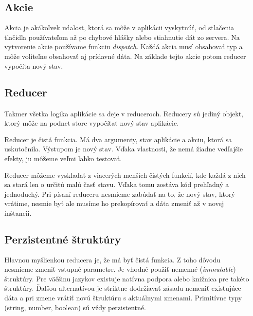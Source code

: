\subsection{Akcie}
Akcia je akákoľvek udalosť, ktorá sa môže v aplikácii vyskytnúť, od stlačenia tlačidla používateľom až po chybové hlášky alebo stiahnutie dát zo servera. Na vytvorenie akcie používame funkciu \emph{dispatch}. Každá akcia musí obsahovať typ a môže voliteľne obsahovať aj prídavné dáta. Na základe tejto akcie potom reducer vypočíta nový stav.

\subsection{Reducer}
\emph{} \cite{reduxReducer}

\paragraph{}
Takmer všetka logika aplikácie sa deje v reduceroch. Reducery sú jediný objekt, ktorý môže na podnet store vypočítať nový stav aplikácie.

Reducer je čistá funkcia. Má dva argumenty, stav aplikácie a akciu, ktorá sa uskutočnila. Výstupom je nový stav. Vďaka vlastnosti, že nemá žiadne vedľajšie efekty, ju môžeme veľmi ľahko testovať.

Reducer môžeme vyskladať z viacerých menších čistých funkcií, kde každá z nich sa stará len o určitú malú časť stavu. Vďaka tomu zostáva kód prehľadný a jednoduchý. 
Pri písaní reduceru nesmieme zabúdať na to, že nový stav, ktorý vrátime, nesmie byť  ale musíme ho prekopírovať a dáta zmeniť až v novej inštancii.

\subsection{Perzistentné štruktúry}
Hlavnou myšlienkou reducera je, že má byť čistá funkcia. Z toho dôvodu nesmieme zmeniť vstupné parametre. Je vhodné použiť nemenné (\emph{immutable}) štruktúry. Pre väčšinu jazykov existuje natívna podpora alebo knižnica pre takéto štruktúry. Ďalšou alternatívou je striktne dodržiavať zásadu nemeniť existujúce dáta a pri zmene vrátiť novú štruktúru s aktuálnymi zmenami. Primitívne typy (string, number, boolean) sú vždy perzistentné.


